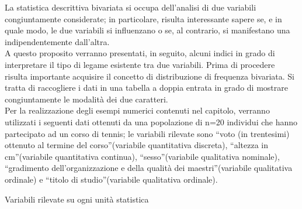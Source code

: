 La statistica descrittiva bivariata si occupa dell'analisi di due variabili 
congiuntamente considerate; in particolare, risulta interessante sapere se, 
e in quale modo, le due variabili si influenzano o se, al contrario, si 
manifestano una indipendentemente dall'altra.\\ 
A questo proposito verranno presentati, in seguito, alcuni indici in grado 
di interpretare il tipo di legame esistente tra due variabili. Prima di 
procedere risulta importante acquisire il concetto di distribuzione di 
frequenza bivariata. 
Si tratta di raccogliere i dati in una tabella a doppia entrata in grado di 
mostrare congiuntamente le modalità dei due caratteri.\\
Per la realizzazione degli esempi numerici contenuti nel capitolo, verranno 
utilizzati i seguenti dati ottenuti da una popolazione di n=20 individui 
che hanno partecipato ad un corso di tennis; le variabili rilevate sono 
\textquotedblleft voto (in trentesimi) ottenuto al termine del 
corso\textquotedblright (variabile quantitativa discreta), 
\textquotedblleft altezza in cm\textquotedblright (variabile quantitativa 
continua), \textquotedblleft sesso\textquotedblright (variabile qualitativa 
nominale), \textquotedblleft gradimento dell'organizzazione e della qualità 
dei maestri\textquotedblright (variabile qualitativa ordinale) e 
\textquotedblleft titolo di studio\textquotedblright (variabile qualitativa 
ordinale).\\
\begin{center}
        Variabili rilevate su ogni unità statistica
\end{center}
